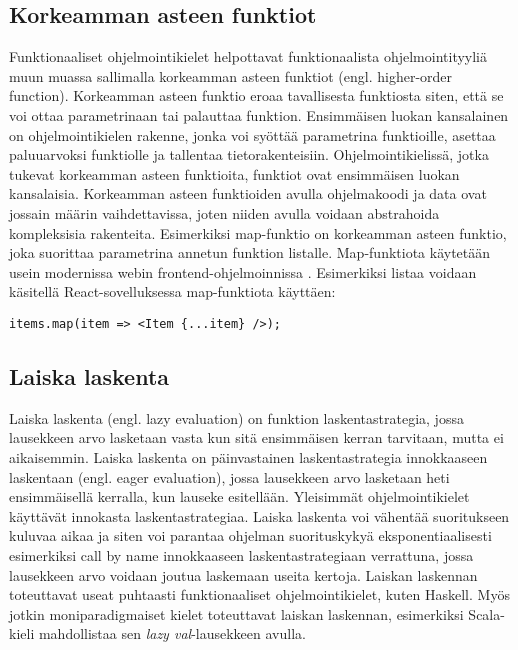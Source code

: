 \subsection{Korkeamman asteen funktiot}
Funktionaaliset ohjelmointikielet helpottavat funktionaalista ohjelmointityyliä muun muassa sallimalla korkeamman asteen
funktiot (engl. higher-order function).  Korkeamman asteen funktio eroaa tavallisesta funktiosta siten, että se voi
ottaa parametrinaan tai palauttaa funktion. Ensimmäisen luokan kansalainen on ohjelmointikielen rakenne, jonka voi
syöttää parametrina funktioille, asettaa paluuarvoksi funktiolle ja tallentaa tietorakenteisiin. Ohjelmointikielissä,
jotka tukevat korkeamman asteen funktioita, funktiot ovat ensimmäisen luokan kansalaisia. Korkeamman asteen funktioiden
avulla ohjelmakoodi ja data ovat jossain määrin vaihdettavissa, joten niiden avulla voidaan abstrahoida kompleksisia
rakenteita. \cite{hudak} Esimerkiksi map-funktio on korkeamman asteen funktio, joka suorittaa parametrina annetun
funktion listalle. Map-funktiota käytetään usein modernissa webin frontend-ohjelmoinnissa \cite{functionalreact}.
Esimerkiksi listaa voidaan käsitellä React-sovelluksessa map-funktiota käyttäen:
\begin{verbatim}
items.map(item => <Item {...item} />);
\end{verbatim}

\subsection{Laiska laskenta}
Laiska laskenta (engl. lazy evaluation) on funktion laskentastrategia, jossa lausekkeen arvo lasketaan vasta kun sitä
ensimmäisen kerran tarvitaan, mutta ei aikaisemmin. Laiska laskenta on päinvastainen laskentastrategia innokkaaseen
laskentaan (engl. eager evaluation), jossa lausekkeen arvo lasketaan heti ensimmäisellä kerralla, kun lauseke
esitellään. Yleisimmät ohjelmointikielet käyttävät innokasta laskentastrategiaa. Laiska laskenta voi vähentää
suoritukseen kuluvaa aikaa ja siten voi parantaa ohjelman suorituskykyä eksponentiaalisesti esimerkiksi call by name
innokkaaseen laskentastrategiaan verrattuna, jossa lausekkeen arvo voidaan joutua laskemaan useita kertoja. Laiskan
laskennan toteuttavat useat puhtaasti funktionaaliset ohjelmointikielet, kuten Haskell. Myös jotkin moniparadigmaiset
kielet toteuttavat laiskan laskennan, esimerkiksi Scala-kieli mahdollistaa sen \textit{lazy val}-lausekkeen avulla.
\cite{languagedesign}

